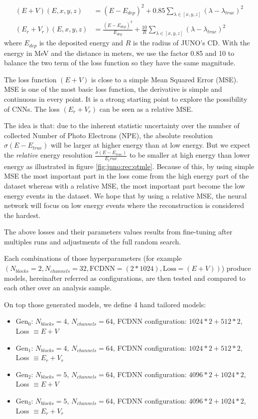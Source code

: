 \documentclass[../main.tex]{subfiles}
\begin{document}
\begin{align}
  (E+V)(E, x, y, z) &= (E - E_{dep})^2 + 0.85 \sum_{\lambda \in [x, y, z]} (\lambda - \lambda_{true})^2 \\
  (E_r + V_r)(E, x, y, z) &=  \frac{(E - E_{dep}) ^ 2}{E_{dep}} + \frac{10}{R} \sum_{\lambda \in [x, y, z]} (\lambda - \lambda_{true})^2
\end{align}
where $E_{dep}$ is the deposited energy and $R$ is the radius of JUNO's CD. With the energy in MeV and the distance in meters, we use the factor 0.85 and 10 to balance the two term of the loss function so they have the same magnitude.


The loss function $(E+V)$ is close to a simple Mean Squared Error (MSE). MSE is one of the most basic loss function, the derivative is simple and continuous in every point. It is a strong starting point to explore the possibility of CNNs. The loss $(E_r + V_r)$ can be seen as a relative MSE.

The idea is that: due to the inherent statistic uncertainty over the number of collected Number of Photo Electrons (NPE), the absolute resolution $\sigma (E - E_{true})$ will be larger at higher energy than at low energy. But we expect the \textit{relative} energy resolution $\frac{\sigma(E - E_{true})}{E_true}$ to be smaller at high energy than lower energy as illustrated in figure \ref{fig:juno:rec:qtmle}. Because of this, by using simple MSE the most important part in the loss come from the high energy part of the dataset whereas with a relative MSE, the most important part become the low energy events in the dataset. We hope that by using a relative MSE, the neural network will focus on low energy events where the reconstruction is considered the hardest.


The above losses and their parameters values results from fine-tuning after multiples runs and adjustments of the full random search.


Each combinations of those hyperparameters (for example $(N_{blocks} = 2, N_{channels} = 32, \mathrm{FCDNN} = (2 * 1024), \mathrm{Loss} = (E+V))$) produce models, hereinafter referred as configurations, are then tested and compared to each other over an analysis sample.

On top those generated models, we define 4 hand tailored models:
\begin{itemize}
  \item $\mathrm{Gen}_0$: $N_{blocks} = 4$, $N_{channels} = 64$, FCDNN configuration: $1024 * 2 + 512 * 2$, Loss $\equiv E+V$
  \item $\mathrm{Gen}_1$: $N_{blocks} = 4$, $N_{channels} = 64$, FCDNN configuration: $1024 * 2 + 512 * 2$, Loss $\equiv E_r+V_r$
  \item $\mathrm{Gen}_2$: $N_{blocks} = 5$, $N_{channels} = 64$, FCDNN configuration: $4096 * 2 + 1024 * 2$, Loss $\equiv E+V$
  \item $\mathrm{Gen}_3$: $N_{blocks} = 5$, $N_{channels} = 64$, FCDNN configuration: $4096 * 2 + 1024 * 2$, Loss $\equiv E_r+V_r$
\end{itemize}
\end{document}
